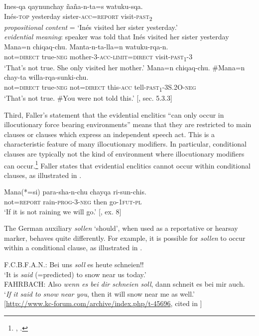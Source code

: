 \ea
\ea
\gll Ines-qa  qaynunchay  ñaña-n-ta=s  watuku-sqa.\\
Inés-\textsc{top}  yesterday  sister-\textsc{acc}=\textsc{report}  visit\textsc{-past}\textsc{\textsubscript{2}}\\
\glt \textit{propositional content} = ‘Inés visited her sister yesterday.’\\
\textit{evidential meaning}: speaker was told that Inés visited her sister yesterday
\ex \gll  Mana=n  chiqaq-chu.  Manta-n-ta-lla=n  watuku-rqa-n.\\
not=\textsc{direct}  true-\textsc{neg}  mother-3-\textsc{acc}-\textsc{limit}=\textsc{direct}  visit-\textsc{past\textsubscript{1}}-3\\
\glt ‘That’s not true. She only visited her mother.’
\ex \gll  Mana=n  chiqaq-chu.  \#Mana=n  chay-ta  willa-rqa-sunki-chu.\\
not=\textsc{direct}  true-\textsc{neg}  not=\textsc{direct}  this-\textsc{acc}  tell\textsc{-past}\textsc{\textsubscript{1}}-3S.2O-\textsc{neg}\\
\glt ‘That’s not true. \#You were not told this.’  [\citealt{Faller2002}, sec. 5.3.3]
\z \z


Third, Faller’s statement that the evidential enclitics “can only occur in illocutionary force bearing environments” means that they are restricted to main clauses or clauses which express an independent speech act. This is a characteristic feature of many illocutionary modifiers. In particular, conditional clauses are typically not the kind of environment where illocutionary modifiers can occur.\footnote{\citet{Ernst2009}, \citet{Haegeman2010a}.} Faller states that evidential enclitics cannot occur within conditional clauses, as illustrated in .


\ea
\gll Mana(*=si)  para-sha-n-chu  chayqa  ri-sun-chis.\\
not=\textsc{report}  rain-\textsc{prog}-3-\textsc{neg}  then  go-1\textsc{fut}-\textsc{pl}\\
\glt ‘If it is not raining we will go.’  [\citealt{Faller2003}, ex. 8]
\z


The German auxiliary \textit{sollen} ‘should’, when used as a reportative or hearsay marker, behaves quite differently. For example, it is possible for \textit{sollen} to occur within a conditional clause, as illustrated in .


\ea
F.C.B.F.A.N.: Bei uns \textit{soll} es heute schneien!!\\
‘It is \textit{said} (=predicted) to snow near us today.’\\
FAHRBACH: Also \textit{wenn es bei dir schneien soll}, dann schneit es bei mir auch.\\
‘\textit{If it said to snow near you}, then it will snow near me as well.’\\
   {}[\url{http://www.kc-forum.com/archive/index.php/t-45696}, cited in \citealt{Faller2006}]
\z


